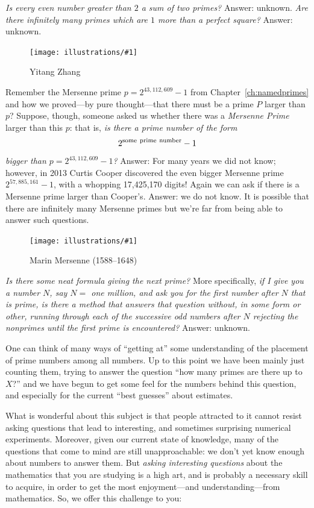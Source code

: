 \documentclass[openany]{book}
\newcommand{\ill}[3]{%
   \begin{figure}[H]%
   \vspace{-2ex}
   \centering%
   \texttt{[image: illustrations/\#1]}%
   \caption{#3}%
   \vspace{-2ex}
    \end{figure}}
\theoremstyle{plain}
\theoremstyle{definition}
\begin{document}
{\em Is every even number greater than $2$ a sum of
  two primes?}  Answer: unknown. {\em Are there infinitely many primes
  which are $1$ more than a perfect square?}  Answer: unknown.

\ill{zhang}{0.25}{Yitang Zhang\label{fig:zhang}}



Remember the Mersenne prime $p= 2^{43,112,609}-1$ from
Chapter~\ref{ch:namedprimes} and how we
proved---by pure thought---that there must be
a prime $P$ larger than $p$? Suppose, though, someone
asked us whether there was a {\it Mersenne Prime} larger than this
$p$: that is, {\em is there a prime number of the form $$2^{\rm some\
  prime\ number}-1$$ bigger than $p= 2^{43,112,609}-1$?} Answer:
For many years we did not know; however, in 2013 Curtis Cooper discovered
the even bigger Mersenne prime $2^{57,885,161}-1$, with a whopping
17,425,170 digits!  Again we can ask if there is a Mersenne
prime larger than Cooper's.  Answer: we do not know.
It is possible that there are infinitely many Mersenne primes
but we're far from being able to answer such questions.

\ill{mersenne}{.3}{Marin Mersenne (1588--1648)}



{\em Is there some neat formula giving the next prime?} More
specifically, {\em if I give you a number $N$, say $N=$ one million,
  and ask you for the first number after $N$ that is prime, is there a
  method that answers that question without, in some form or other,
  running through each of the successive odd numbers after $N$ rejecting
  the nonprimes until the first prime is encountered?}  Answer:
unknown.



One can think of many ways of ``getting at'' some understanding of the
placement of prime numbers among all numbers.  Up to this point we have
been mainly just counting them, trying to answer the question ``how
many primes are there up to $X$?''  and we have begun to get some feel
for the numbers behind this question, and especially for the current
``best guesses'' about estimates.


What is wonderful about this subject is that people attracted to it
cannot resist asking questions that lead to interesting, and sometimes
surprising numerical experiments. Moreover, given our current state of
knowledge, many of the questions that come to mind are still
unapproachable: we don't yet know enough about numbers to answer them.
But {\it asking interesting questions} about the mathematics that you
are studying is a high art, and is probably a necessary skill to
acquire, in order to get the most enjoyment---and understanding---from
mathematics.  So, we offer this challenge to you:
\end{document}
